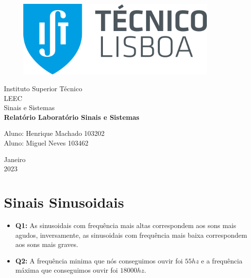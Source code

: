 \documentclass[a4paper, 12pt]{article}
\begin{document}
\begin{titlepage}
    \begin{center}

        \begin{figure}[!ht]
            \centering
            \includegraphics[width=10cm]{images/IST.png}
        \end{figure}

        \Huge{Instituto Superior Técnico}\\
        \large{LEEC}\\
        \large{Sinais e Sistemas}\\
        \vspace{15pt}
        \vspace{95pt}
        \textbf{\LARGE{Relatório Laboratório Sinais e Sistemas}}\\
        \vspace{3,5cm}
    \end{center}

    \begin{flushleft}
        \begin{tabbing}
            Aluno: Henrique Machado 103202 \\
            Aluno: Miguel Neves 103462 \\
        \end{tabbing}
    \end{flushleft}
    \vspace{1cm}

    \begin{center}
        \vspace{\fill}
        Janeiro\\
        2023
    \end{center}
\end{titlepage}
\newpage
\tableofcontents
\thispagestyle{empty}
\newpage
{}
\section{Sinais Sinusoidais}
\begin{itemize}
    \item \textbf{Q1:} As sinusoidais com frequência mais altas correspondem aos sons mais agudos, inversamente, as sinusoidais com frequência mais baixa correspondem aos sons mais graves.
    \item \textbf{Q2:} A frequência minima que nós conseguimos ouvir foi $55hz$ e a frequência máxima que conseguimos ouvir foi $18000hz$.
\end{itemize}
\vspace{15px}
\end{document}
